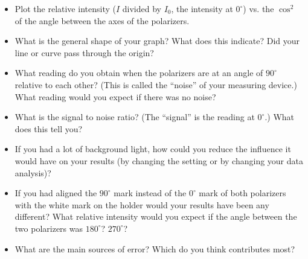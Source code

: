 \begin{itemize}
\item Plot the relative intensity ($I$ divided by $I_0$, the intensity at $0^{\circ}$) vs. the $\cos^2$ of the angle between the axes of the polarizers.

\item What is the general shape of your graph? What does this indicate? Did your line or curve pass through the origin?

\item What reading do you obtain when the polarizers are at an angle of $90^{\circ}$ relative to each other? (This is called the ``noise'' of your measuring device.) What reading would you expect if there was no noise?

\item What is the signal to noise ratio? (The ``signal'' is the reading at $0^{\circ}$.) What does this tell you?

\item If you had a lot of background light, how could you reduce the influence it would have on your results (by changing the setting or by changing your data analysis)?

\item If you had aligned the $90^{\circ}$ mark instead of the $0^{\circ}$ mark of both polarizers with the white mark on the holder would your results have been any different? What relative intensity would you expect if the angle between the two polarizers was $180^{\circ}$? $270^{\circ}$?

\item What are the main sources of error? Which do you think contributes most?
\end{itemize}

